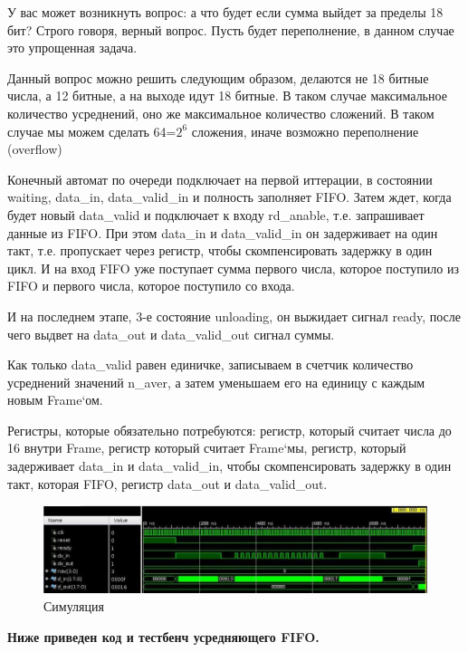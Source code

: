 У вас может возникнуть вопрос: а что будет если сумма выйдет за пределы 18 бит? Строго говоря, верный вопрос. Пусть будет переполнение, в данном случае это упрощенная задача.

Данный вопрос можно решить следующим образом, делаются не 18 битные числа, а 12 битные, а на выходе идут 18 битные. В таком случае максимальное количество усреднений, оно же максимальное количество сложений. В таком случае мы можем сделать 64=$2^6$ сложения, иначе возможно переполнение (overflow)

Конечный автомат по очереди подключает на первой иттерации, в состоянии waiting, data\_in, data\_valid\_in и полность заполняет FIFO. Затем ждет, когда будет новый data\_valid и подключает к входу rd\_anable, т.е. запрашивает данные из FIFO. При этом data\_in и data\_valid\_in он задерживает на один такт, т.е. пропускает через регистр, чтобы скомпенсировать задержку в один цикл. И на вход FIFO уже поступает сумма первого числа, которое поступило из FIFO и первого числа, которое поступило со входа.

И на последнем этапе, 3-е состояние unloading, он выжидает сигнал ready, после чего выдвет на data\_out и data\_valid\_out сигнал суммы. 

Как только data\_valid равен единичке, записываем в счетчик количество усреднений значений n\_aver, а затем уменьшаем его на единицу с каждым новым Frame`ом.

Регистры, которые обязательно потребуются: регистр, который считает числа до 16 внутри Frame, регистр который считает Frame`мы, регистр, который задерживает data\_in и data\_valid\_in, чтобы скомпенсировать задержку в один такт, которая FIFO, регистр data\_out и data\_valid\_out.

\begin{figure}[h]
\centering
\includegraphics[width=1.1\textwidth]{simulation}
\caption{Симуляция}
\label{simulation}
\end{figure}

\begin{center}
\textbf{Ниже приведен код и тестбенч усредняющего FIFO.}
\end{center}



